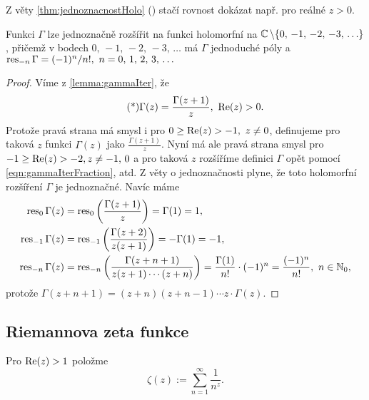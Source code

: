 \begin{note*}
Z věty \cref{thm:jednoznacnostHolo} () stačí rovnost dokázat např. pro reálné $z>0$.
\end{note*}

\begin{lemma}
Funkci $\Gamma$ lze jednoznačně rozšířit na funkci holomorfní na $\operatorname{\mathbb{C}}\setminus\{0,\,-1,\,-2,\,-3,\,\ldots\}$, přičemž v bodech $0,\,-1,\,-2,\,-3,\,\ldots$ 
má $\Gamma$ jednoduché póly a $\operatorname{res}_{-n}\Gamma=(-1)^n/n!,\  n=0,\,1,\,2,\,3,\,\ldots$ 
\end{lemma}

\begin{proof}
Víme z \cref{lemma:gammaIter}, že
\begin{equation}\tag{*}\label{eqn:gammaIterFraction}
    \Gamma(z)=\frac{\Gamma(z+1)}{z},\ \operatorname{Re}(z)>0.
\end{equation}
Protože pravá strana má smysl i pro $0\geq\operatorname{Re}(z)>-1,\ z\neq 0$, definujeme pro taková $z$ funkci $\Gamma(z)$ jako $\frac{\Gamma(z+1)}{z}$. Nyní má ale pravá strana smysl pro $-1\geq\operatorname{Re}(z)>-2, z\neq-1,\,0$ a pro taková $z$ rozšíříme definici $\Gamma$ opět pomocí \cref{eqn:gammaIterFraction}, atd. Z věty o jednoznačnosti plyne, že toto holomorfní rozšíření $\Gamma$ je jednoznačné. Navíc máme 
\begin{align*}
    \res_0\Gamma(z)&=\res_0\left(\frac{\Gamma(z+1)}{z}\right)=\Gamma(1)=1, \\
    \res_{-1}\Gamma(z)&=\res_{-1}\left(\frac{\Gamma(z+2)}{z(z+1)}\right)=-\Gamma(1)=-1, \\
    \res_{-n}\Gamma(z)&=\res_{-n}\left(\frac{\Gamma(z+n+1)}{z(z+1)\cdots(z+n)}\right)=\frac{\Gamma(1)}{n!}\cdot(-1)^n=\frac{(-1)^n}{n!},\ n \in \N_0,
\end{align*}
protože $\Gamma(z+n+1)=(z+n)(z+n-1) \cdots z \cdot \Gamma(z)$.
\end{proof}

\subsection{Riemannova zeta funkce}

\begin{definition}
Pro $\operatorname{Re}(z)>1$ položme
\begin{equation}\label{eqn:zeta}
    \zeta(z):=\sum_{n=1}^\infty \frac{1}{n^z}.
\end{equation}
\end{definition}

